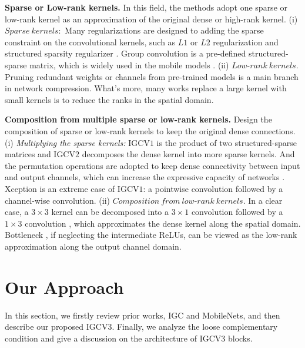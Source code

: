 \documentclass{bmvc2k}
\begin{document}
	\noindent\textbf{Sparse or Low-rank kernels.} In this field, the methods adopt one sparse or low-rank kernel as an approximation of the original dense or high-rank kernel.
	(i) $Sparse\ kernels:$ Many regularizations are designed to adding the sparse constraint on the convolutional kernels, such as $L1$ or $L2$ regularization \cite{HanMD15,HanPTD15} and structured sparsity regularizer \cite{LiKDSG16,WenWWCL16,alvarez2016learning}. Group convolution is a pre-defined structured-sparse matrix, which is widely used in the mobile models \cite{XieGDTH16,ZhaoWLTZ16}. (ii) $Low$-$rank\ kernels.$ Pruning redundant weights or channels from pre-trained models \cite{park2016faster,LiKDSG16,he2017channel,LuoWL17} is a main branch in network compression. What's more, many works \cite{SimonyanZ14a,SzegedyVISW16,denton2014exploiting} replace a large kernel with small kernels is to reduce the ranks in the spatial domain.
	
	\noindent\textbf{Composition from multiple sparse or low-rank kernels.} Design the composition of sparse or low-rank kernels to keep the original dense connections.
	(i) \emph{Multiplying the sparse kernels:} IGCV$1$ \cite{zhang2017interleaved} is the product of two structured-sparse matrices and IGCV$2$ \cite{ISSC18} decomposes the dense kernel into more sparse kernels. And the permutation operations \cite{zhang2017interleaved} are adopted to keep dense connectivity between input and output channels, which can increase the expressive capacity of networks \cite{sharir2017expressive}.
	Xception \cite{Chollet16a} is an extreme case of IGCV$1$: a pointwise convolution followed by a channel-wise convolution.
	(ii) $Composition\ from\ low$-$rank\ kernels.$ In a clear case, a $3\times3$ kernel can be decomposed into a $3\times1$ convolution followed by a $1\times3$ convolution \cite{IoannouRSCC15, JaderbergVZ14, MamaletG12}, which approximates the dense kernel along the spatial domain. Bottleneck \cite{he2016deep,iandola2016squeezenet,sandler2018inverted}, if neglecting the intermediate ReLUs, can be viewed as the low-rank approximation along the output channel domain.
	
	\section{Our Approach}
	In this section, we firstly review prior works, IGC and MobileNets, and then describe our proposed IGCV$3$. Finally, we analyze the loose complementary condition and give a discussion on the architecture of IGCV$3$ blocks.
	
\end{document}
